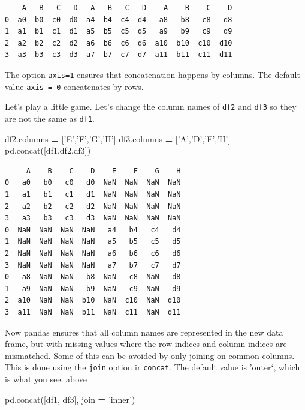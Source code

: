\documentclass[
  letterpaper,
]{scrbook}
\newenvironment{Shaded}{\begin{snugshade}}{\end{snugshade}}
\newcommand{\NormalTok}[1]{#1}
\newcommand{\OperatorTok}[1]{\textcolor[rgb]{0.81,0.36,0.00}{\textbf{#1}}}
\newcommand{\StringTok}[1]{\textcolor[rgb]{0.31,0.60,0.02}{#1}}
\begin{document}
\begin{verbatim}
    A   B   C   D   A   B   C   D    A    B    C    D
0  a0  b0  c0  d0  a4  b4  c4  d4   a8   b8   c8   d8
1  a1  b1  c1  d1  a5  b5  c5  d5   a9   b9   c9   d9
2  a2  b2  c2  d2  a6  b6  c6  d6  a10  b10  c10  d10
3  a3  b3  c3  d3  a7  b7  c7  d7  a11  b11  c11  d11
\end{verbatim}

The option \texttt{axis=1} ensures that concatenation happens by columns. The default value \texttt{axis\ =\ 0} concatenates by rows.

Let's play a little game. Let's change the column names of \texttt{df2} and \texttt{df3} so they are not the same as \texttt{df1}.

\begin{Shaded}
\begin{Highlighting}[]
\NormalTok{df2.columns }\OperatorTok{=}\NormalTok{ [}\StringTok{'E'}\NormalTok{,}\StringTok{'F'}\NormalTok{,}\StringTok{'G'}\NormalTok{,}\StringTok{'H'}\NormalTok{]}
\NormalTok{df3.columns }\OperatorTok{=}\NormalTok{ [}\StringTok{'A'}\NormalTok{,}\StringTok{'D'}\NormalTok{,}\StringTok{'F'}\NormalTok{,}\StringTok{'H'}\NormalTok{]}
\NormalTok{pd.concat([df1,df2,df3])}
\end{Highlighting}
\end{Shaded}

\begin{verbatim}
     A    B    C    D    E    F    G    H
0   a0   b0   c0   d0  NaN  NaN  NaN  NaN
1   a1   b1   c1   d1  NaN  NaN  NaN  NaN
2   a2   b2   c2   d2  NaN  NaN  NaN  NaN
3   a3   b3   c3   d3  NaN  NaN  NaN  NaN
0  NaN  NaN  NaN  NaN   a4   b4   c4   d4
1  NaN  NaN  NaN  NaN   a5   b5   c5   d5
2  NaN  NaN  NaN  NaN   a6   b6   c6   d6
3  NaN  NaN  NaN  NaN   a7   b7   c7   d7
0   a8  NaN  NaN   b8  NaN   c8  NaN   d8
1   a9  NaN  NaN   b9  NaN   c9  NaN   d9
2  a10  NaN  NaN  b10  NaN  c10  NaN  d10
3  a11  NaN  NaN  b11  NaN  c11  NaN  d11
\end{verbatim}

Now pandas ensures that all column names are represented in the new data frame, but with missing values where the row indices and column indices are mismatched. Some of this can be avoided by only joining on common columns. This is done using the \texttt{join} option ir \texttt{concat}. The default value is 'outer`, which is what you see. above

\begin{Shaded}
\begin{Highlighting}[]
\NormalTok{pd.concat([df1, df3], join }\OperatorTok{=} \StringTok{'inner'}\NormalTok{)}
\end{Highlighting}
\end{Shaded}
\end{document}
